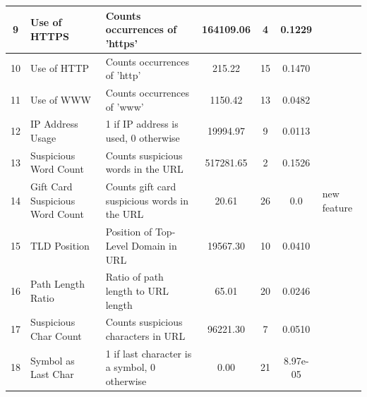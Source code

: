 \documentclass{article}
\begin{document}
\begin{table}[H]
\begin{tabular}{|c|l|p{6cm}|c|c|c|l|}
            9            & Use of HTTPS                    & Counts occurrences of 'https'                  & 164109.06          & 4                    & 0.1229                   & \cite{PhishSafe}                                \\ \hline
            10           & Use of HTTP                     & Counts occurrences of 'http'                   & 215.22             & 15                   & 0.1470                   & \cite{PhishSafe} \cite{LexicalFeatureSelection} \\ \hline
            11           & Use of WWW                      & Counts occurrences of 'www'                    & 1150.42            & 13                   & 0.0482                   &                                                 \\ \hline
            12           & IP Address Usage                & 1 if IP address is used, 0 otherwise           & 19994.97           & 9                    & 0.0113                   &                                                 \\ \hline
            13           & Suspicious Word Count           & Counts suspicious words in the URL             & 517281.65          & 2                    & 0.1526                   & \cite{PhishSafe} \cite{LexicalFeatureSelection} \\ \hline
            14           & Gift Card Suspicious Word Count & Counts gift card suspicious words in the URL   & 20.61              & 26                   & 0.0                      & new feature \\ \hline
            15           & TLD Position                    & Position of Top-Level Domain in URL            & 19567.30           & 10                   & 0.0410                   & \cite{PhishSafe}                                \\ \hline
            16           & Path Length Ratio               & Ratio of path length to URL length             & 65.01              & 20                   & 0.0246                   & \cite{LexicalFeatureSelection}                  \\ \hline
            17           & Suspicious Char Count           & Counts suspicious characters in URL            & 96221.30           & 7                    & 0.0510                   & \cite{LexicalFeatureSelection}                  \\ \hline
            18           & Symbol as Last Char             & 1 if last character is a symbol, 0 otherwise   & 0.00               & 21                   & 8.97e-05                 & \cite{LexicalFeatureSelection} \\ \hline

\end{tabular}
\end{table}
\end{document}
